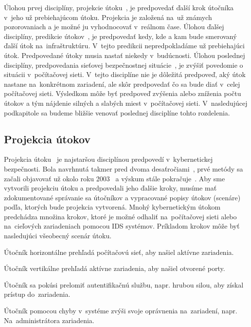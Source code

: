 \documentclass[thesismargins, thesislinespacing, openright, upjsfrontpage]{rnthesis}
\begin{document}
Úlohou prvej disciplíny, projekcie útoku~\cite{Yang2014}, je predpovedať ďalší krok útočníka v~jeho už prebiehajúcom útoku. Projekcia je založená na~už známych pozorovaniach a je možné ju vyhodnocovať v~reálnom čase. Úlohou ďalšej disciplíny, predikcie útokov~\cite{Abdlhamed2017}, je predpovedať kedy, kde a kam bude smerovaný ďalší útok na~infraštruktúru. V~tejto predikcii nepredpokladáme už prebiehajúci útok. Predpovedané útoky musia nastať niekedy v~budúcnosti. Úlohou poslednej disciplíny, predpovedania sieťovej bezpečnostnej situácie~\cite{wei2013comprehensive,Leau2015}, je zvýšiť povedomie o situácii v~počítačovej sieti. V~tejto disciplíne nie je dôležitá predpoveď, aký útok nastane na~konkrétnom zariadení, ale skôr predpovedať čo sa bude diať v~celej počítačovej sieti. Výsledkom môže byť predpoveď zvýšenia alebo zníženia počtu útokov a tým nájdenie silných a slabých miest v~počítačovej sieti. V~nasledujúcej podkapitole sa budeme bližšie venovať poslednej disciplíne tohto rozdelenia.

\subsection{Projekcia útokov}

Projekcia útoku~\cite{Yang2014} je najstaršou disciplínou predpovedí v~kybernetickej bezpečnosti. Bola navrhnutá takmer pred dvoma desaťročiami~\cite{geib2001plan}, prvé metódy sa začali objavovať už okolo roku 2003~\cite{hughes2003attack,qin2004attack} a výskum stále pokračuje~\cite{ahmed2017attack,zhang2019intrusion}. Aby sme vytvorili projekciu útoku a predpovedali jeho ďalšie kroky, musíme mať zdokumentované správanie sa útočníkov a vypracované popisy útokov (scenáre) podľa, ktorých bude projekcia vytvorená. Mnohý kybernetickým útokom predchádza množina krokov, ktoré je možné odhaliť na~počítačovej sieti alebo na~cieľových zariadeniach pomocou IDS systémov. Príkladom krokov môže byť nasledujúci všeobecný scenár útoku.

\begin{compactenum}
    \item Útočník horizontálne prehľadá počítačovú sieť, aby našiel aktívne zariadenia.
    \item Útočník vertikálne prehľadá aktívne zariadenia, aby našiel otvorené porty.
    \item Útočník sa pokúsi prelomiť autentifikačnú službu, napr. hrubou silou, aby získal prístup do~zariadenia.
    \item Útočník pomocou chyby v~systéme zvýši svoje oprávnenia na~zariadení, napr. Na~administrátora zariadenia.
\end{compactenum}
\end{document}
